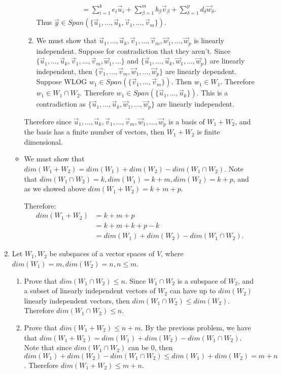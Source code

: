 \documentclass[12pt, letterpaper]{article}
\begin{document}
\begin{enumerate}
\begin{itemize}
\begin{enumerate}
\begin{align*}
			&=  \sum_{i=1}^k e_i \Vec{u}_i +  \sum_{\beta = 1}^m b_\beta \Vec{v}_\beta + \sum_{\delta = 1}^p d_\delta \Vec{w}_\delta.		
		\end{align*}
		Thus $\Vec{y} \in Span(\{\Vec{u}_1, \ldots, \Vec{u}_k, \Vec{v}_1,\ldots, \Vec{v}_m\})$.
		\item We must show that 	$\Vec{u}_1, \ldots, \Vec{u}_k, \Vec{v}_1,\ldots, \Vec{v}_m, \Vec{w}_1,\ldots, \Vec{w}_p$ is linearly independent.  Suppose for contradiction that they aren't.  Since $\{\Vec{u}_1, \ldots, \Vec{u}_k, \Vec{v}_1,\ldots, \Vec{v}_m, \Vec{w}_1,\ldots\}$ and $\{\Vec{u}_1, \ldots, \Vec{u}_k, \Vec{w}_1,\ldots, \Vec{w}_p\}$ are linearly independent, then $\{\Vec{v}_1,\ldots, \Vec{v}_m,\Vec{w}_1,\ldots, \Vec{w}_p\}$ are linearly dependent.  Suppose WLOG $w_1 \in Span(\{\Vec{v}_1,\ldots, \Vec{v}_m\})$.  Then $w_1 \in W_1$.  Therefore $w_1 \in W_1 \cap W_2$.  Therefore $w_1 \in Span(\{\Vec{u}_1,\ldots,\Vec{u}_k\})$.  This is a contradiction as $\{\Vec{u}_1, \ldots, \Vec{u}_k, \Vec{w}_1,\ldots, \Vec{w}_p\}$ are linearly independent.       
		\end{enumerate}
		Therefore since $\Vec{u}_1, \ldots, \Vec{u}_k, \Vec{v}_1,\ldots, \Vec{v}_m, \Vec{w}_1,\ldots, \Vec{w}_p$ is a basis of $W_1 + W_2$, and the basis has a finite number of vectors, then $W_1 + W_2$ is finite dimensional.
		\item We must show that $dim(W_1 + W_2) = dim(W_1) + dim(W_2) - dim(W_1 \cap W_2)$.  Note that $dim(W_1 \cap W_2) = k, dim(W_1) = k+m, dim(W_2) = k+p$, and as we showed above $dim(W_1 + W_2) = k + m + p$.  
		
		Therefore: 
		\begin{align*}
		dim(W_1 + W_2) &=  k + m + p\\
		&= k + m + k + p - k\\
		&= dim(W_1) + dim(W_2) - dim(W_1 \cap W_2).
		\end{align*}
		\end{itemize}
		\newpage
		
		\item Let $W_1, W_2$ be subspaces of a vector spaces of $V$, where $dim(W_1) = m, dim(W_2) = n, n \leq m$.
		\begin{enumerate}
			\item Prove that $dim(W_1 \cap W_2) \leq n$.
			Since $W_1 \cap W_2$ is a subspace of $W_2$, and a subset of linearly independent vectors of $W_2$ can have up to $dim(W_2)$ linearly independent vectors, then $dim(W_1 \cap W_2) \leq dim(W_2)$.  Therefore $dim(W_1 \cap W_2) \leq n$.
			\item Prove that $dim(W_1 + W_2) \leq n+m$.
			By the previous problem, we have that $dim(W_1 + W_2) = dim(W_1) + dim(W_2) - dim(W_1 \cap W_2)$.  Note that since $dim(W_1 \cap W_2)$ can be $0$, then $ dim(W_1) + dim(W_2) - dim(W_1 \cap W_2) \leq dim(W_1) + dim(W_2) = m + n$.  Therefore $dim(W_1 + W_2) \leq m + n$.
		\end{enumerate}		  
		

\end{enumerate}
\end{document}
